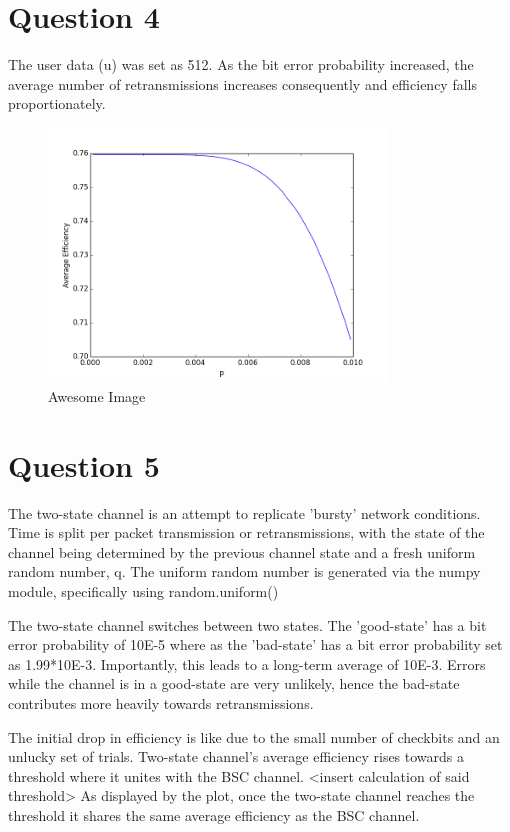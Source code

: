 \documentclass{article}
\begin{document}
\section*{Question 4}
The user data (u) was set as 512. As the bit error probability increased, the average number of retransmissions increases consequently and efficiency falls proportionately.
\begin{figure}[H]
    \centering
    \includegraphics[width=0.8\textwidth]{q4.png}
    \caption{Awesome Image}
    \label{fig:awesome_image}
\end{figure}



\section*{Question 5}
 The two-state channel is an attempt to replicate 'bursty' network conditions. Time is split per packet transmission or retransmissions, with the state of the channel being determined by the previous channel state and a fresh uniform random number, q. The uniform random number is generated via the numpy module, specifically using random.uniform()

The two-state channel switches between two states. The 'good-state' has a bit error probability of 10E-5 where as the 'bad-state' has a bit error probability set as 1.99*10E-3. Importantly, this leads to a long-term average of 10E-3. Errors while the channel is in a good-state are very unlikely, hence the bad-state contributes more heavily towards retransmissions.

The initial drop in efficiency is like due to the small number of checkbits and an unlucky set of trials. Two-state channel's average efficiency rises towards a threshold where it unites with the BSC channel. <insert calculation of said threshold> As displayed by the plot, once the two-state channel reaches the threshold it shares the same average efficiency as the BSC channel.
\end{document}
